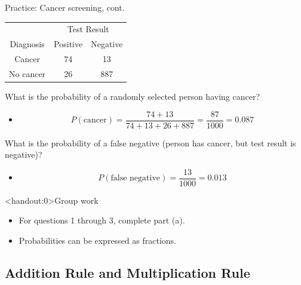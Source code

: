 \documentclass[xcolor=table]{beamer}
\begin{document}
\begin{frame}{Practice: Cancer screening, cont.}
\begin{block}{}
{\centering
\begin{tabular}{c | c  c }
\multicolumn{1}{c}{} & \multicolumn{2}{c}{Test Result}\\
Diagnosis & Positive & Negative \\
\hline
Cancer & 74 & 13 \\
No cancer & 26 & 887\\
\end{tabular}\par
}
\end{block}

\begin{exampleblock}{}
What is the probability of a randomly selected person having cancer?
\begin{itemize}
\pause
\item \[P(\text{cancer}) = \frac {74 + 13}{74+13+26+887} = \frac {87}{1000} = 0.087\]
\end{itemize}

\pause
What is the probability of a false negative (person has cancer, but test result is negative)?
\begin{itemize}
\pause
\item \[ P(\text{false negative}) = \frac {13}{1000} = 0.013\]
\end{itemize}
\end{exampleblock}
\end{frame}

\begin{frame}<handout:0>{Group work}
\begin{block}{}
\large
\begin{itemize}
\item For questions 1 through 3, complete part (a).
\item Probabilities can be expressed as fractions.
\end{itemize}
\end{block}
\end{frame}

\subsection{Addition Rule and Multiplication Rule}
\end{document}
